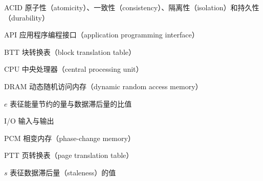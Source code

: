 \begin{denotation}
\item[ACID] 原子性（atomicity）、一致性（consistency）、隔离性（isolation）和持久性（durability）
\item[API] 应用程序编程接口（application programming interface）
\item[BTT] 块转换表（block translation table）
\item[CPU] 中央处理器（central processing unit）
\item[DRAM] 动态随机访问内存（dynamic random access memory）
\item[$e$] 表征能量节约的量与数据滞后量的比值
\item[I/O] 输入与输出
\item[PCM] 相变内存（phase-change memory）
\item[PTT] 页转换表（page translation table）
\item[$s$] 表征数据滞后量（staleness）的值
\end{denotation}
